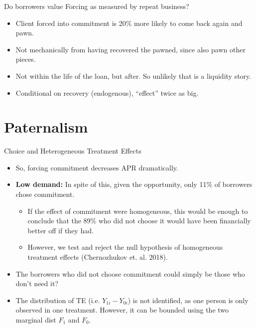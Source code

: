 \documentclass[8pt]{beamer}
\begin{document}
\begin{frame}{Do borrowers value Forcing as measured by repeat business?}


\vspace{.2in}
\begin{table}[H]
\begin{center}
\footnotesize{}
\end{center}
\end{table}    
\begin{itemize}
    \item Client forced into commitment is 20\% more likely to come back again and pawn.
    \item Not mechanically from having recovered the pawned, since also pawn other pieces.
    \item Not within the life of the loan, but after. So unlikely that is a liquidity story.
    \item Conditional on recovery (endogenous), ``effect'' twice as big.
\end{itemize}

\end{frame}








\section{Paternalism}
\begin{frame}{Choice and Heterogeneous Treatment Effects}
\label{choice_hte}
    \begin{itemize}
    \vfill \item  So, forcing commitment decreases APR dramatically. 
    
    \vfill \item \textbf{Low demand:} In spite of this, given the opportunity, only 11\% of borrowers chose commitment.   
    \begin{itemize}
       \pause \item If the effect of commitment were homogeneous, this would be enough to conclude that the 89\% who did not choose it would have been financially better off if they had.
       \item However, we test and reject the null hypothesis of homogeneous treatment effects (Chernozhukov et. al. 2018).
    \end{itemize}
    
    \vfill \item The borrowers who did not choose commitment could simply be those who don’t need it?
    \pause \vfill \item The distribution of TE (i.e. $Y_{1i}-Y_{0i}$) is not identified, as one person is only observed in one treatment. However, it can be bounded using the two marginal dist $F_1$ and $F_0$. 

    \end{itemize}
\end{frame}
\end{document}
